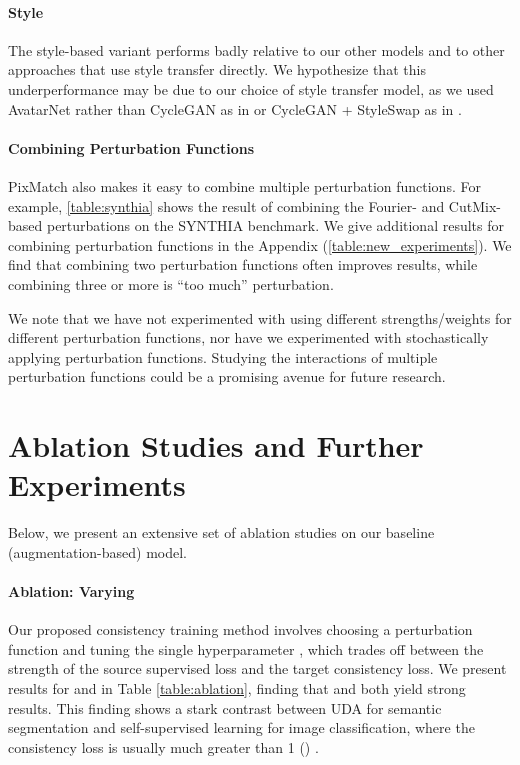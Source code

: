 \documentclass[final]{cvpr}
\begin{document}
\vspace{-1mm}
\paragraph{Style} The style-based variant performs badly relative to our other models and to other approaches that use style transfer directly. We hypothesize that this underperformance may be due to our choice of style transfer model, as we used AvatarNet \cite{sheng2018avatar} rather than CycleGAN as in \cite{li2019bidirectional} or CycleGAN + StyleSwap as in \cite{kim2020learning}.

\paragraph{Combining Perturbation Functions}

PixMatch also makes it easy to combine multiple perturbation functions. 
For example, \autoref{table:synthia} shows the result of combining the Fourier- and CutMix-based perturbations on the SYNTHIA benchmark. We give additional results for combining perturbation functions in the Appendix (\autoref{table:new_experiments}). We find that combining two perturbation functions often improves results, while combining three or more is ``too much'' perturbation. 

We note that we have not experimented with using different strengths/weights for different perturbation functions, nor have we experimented with stochastically applying perturbation functions. Studying the interactions of multiple perturbation functions could be a promising avenue for future research. 

\section{Ablation Studies and Further Experiments}

Below, we present an extensive set of ablation studies on our baseline (augmentation-based) model. 


\paragraph{Ablation: Varying }

Our proposed consistency training method involves choosing a perturbation function and tuning the single hyperparameter , which trades off between the strength of the source supervised loss and the target consistency loss. We present results for  and  in Table \ref{table:ablation}, finding that  and  both yield strong results. This finding shows a stark contrast between UDA for semantic segmentation and self-supervised learning for image classification, where the consistency loss is usually much greater than 1 () \cite{fixmatch,xie2019unsupervised}.
\end{document}
